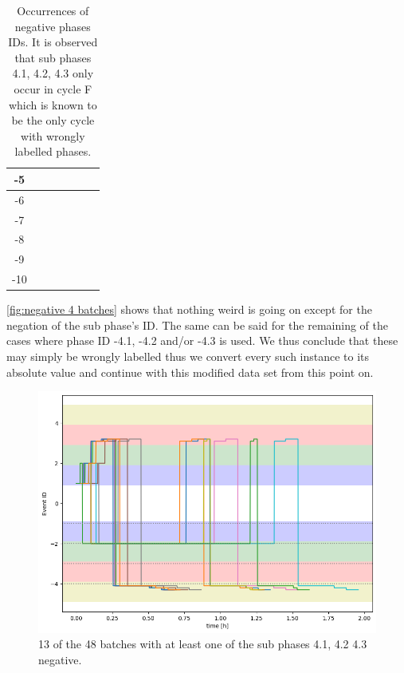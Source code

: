 \documentclass[../Thesis.tex]{subfiles}
\begin{document}
\begin{table}[h]
\begin{tabular}{c|c|c|c|c|c|c}
        -5                     & \cellcolor{black!50} & \cellcolor{black!50} & \cellcolor{black!50} & \cellcolor{black!50} & \cellcolor{black!50} & \cellcolor{black!50} \\\hline
        -6                     &                      & \cellcolor{black!50} & \cellcolor{black!50} & \cellcolor{black!50} & \cellcolor{black!50} & \cellcolor{black!50} \\\hline
        -7                     & \cellcolor{black!50} &                      & \cellcolor{black!50} & \cellcolor{black!50} & \cellcolor{black!50} & \cellcolor{black!50} \\\hline
        -8                     & \cellcolor{black!50} &                      & \cellcolor{black!50} & \cellcolor{black!50} & \cellcolor{black!50} & \cellcolor{black!50} \\\hline
        -9                     &                      &                      &                      & \cellcolor{black!50} & \cellcolor{black!50} & \cellcolor{black!50} \\\hline
        -10                    &                      & \cellcolor{black!50} &                      & \cellcolor{black!50} & \cellcolor{black!50} & \cellcolor{black!50}
    \end{tabular}
    \caption{Occurrences of negative phases IDs. It is observed that sub phases 4.1, 4.2, 4.3 only occur in cycle F which is known to be the only cycle with wrongly labelled phases.}
    \label{tab:phase negative observations}
\end{table}



\autoref{fig:negative 4 batches} shows that nothing weird is going on except for the negation of the sub phase's ID. The same can be said for the remaining of the cases where phase ID -4.1, -4.2 and/or -4.3 is used. We thus conclude that these may simply be wrongly labelled thus we convert every such instance to its absolute value and continue with this modified data set from this point on.

\begin{figure}[H]
    \centering
    \includegraphics[width=.85\linewidth]{figures/Multiple cycles data/Adding of solids/sample negative sub 4 phases.png}
    \caption{13 of the 48 batches with at least one of the sub phases 4.1, 4.2 4.3 negative.}
    \label{fig:negative 4 batches}
\end{figure}
\end{document}
